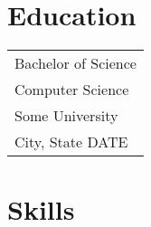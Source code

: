 \documentclass[11pt]{article} 						%
\begin{document}
\begin{multicols}{2}
{{\begin{minipage}[t][\paperheight]{.38\textwidth}
\begin{minipage}[t][\paperheight]{.95\textwidth}
\section{\faGraduationCap{} Education}
	\vspace{1ex}
	\begin{tabularx}{\textwidth}{@{\hspace{2.9em}}l@{}}
		\color{jobTitleText}\Large Bachelor of Science\vspace{1ex}\\
		\large Computer Science \color{jobTitleText}\faLaptopCode \vspace{2ex}\\
		\color{subsectionText}\Large Some University\vspace{.5ex}\\
		City, State \dotfill{} DATE\\
	\end{tabularx}
%
%
\vspace{3ex}
\section{\faCogs{} Skills}
\vspace{-1ex}

\end{minipage}
\end{minipage}}}
\end{multicols}
\end{document}
